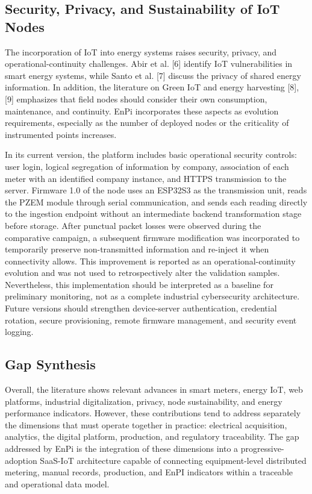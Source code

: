 \documentclass{ieeeaccess}
\begin{document}
\subsection{Security, Privacy, and Sustainability of IoT Nodes}
\label{subsec:security-privacy}

The incorporation of IoT into energy systems raises security, privacy, and operational-continuity challenges. Abir et al. [6] identify IoT vulnerabilities in smart energy systems, while Santo et al. [7] discuss the privacy of shared energy information. In addition, the literature on Green IoT and energy harvesting [8], [9] emphasizes that field nodes should consider their own consumption, maintenance, and continuity. EnPi incorporates these aspects as evolution requirements, especially as the number of deployed nodes or the criticality of instrumented points increases.

In its current version, the platform includes basic operational security controls: user login, logical segregation of information by company, association of each meter with an identified company instance, and HTTPS transmission to the server. Firmware 1.0 of the node uses an ESP32S3 as the transmission unit, reads the PZEM module through serial communication, and sends each reading directly to the ingestion endpoint without an intermediate backend transformation stage before storage. After punctual packet losses were observed during the comparative campaign, a subsequent firmware modification was incorporated to temporarily preserve non-transmitted information and re-inject it when connectivity allows. This improvement is reported as an operational-continuity evolution and was not used to retrospectively alter the validation samples. Nevertheless, this implementation should be interpreted as a baseline for preliminary monitoring, not as a complete industrial cybersecurity architecture. Future versions should strengthen device-server authentication, credential rotation, secure provisioning, remote firmware management, and security event logging.

\subsection{Gap Synthesis}
\label{subsec:gap-synthesis}

Overall, the literature shows relevant advances in smart meters, energy IoT, web platforms, industrial digitalization, privacy, node sustainability, and energy performance indicators. However, these contributions tend to address separately the dimensions that must operate together in practice: electrical acquisition, analytics, the digital platform, production, and regulatory traceability. The gap addressed by EnPi is the integration of these dimensions into a progressive-adoption SaaS-IoT architecture capable of connecting equipment-level distributed metering, manual records, production, and EnPI indicators within a traceable and operational data model.
\end{document}
